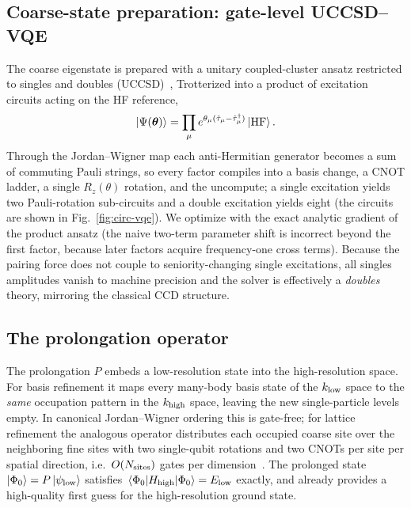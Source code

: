 \documentclass[
  aps,            %
  prc,            %
  reprint,        %
  superscriptaddress,
  floatfix,
  nofootinbib
]{revtex4-2}
\newcommand{\Hhigh}{H_{\mathrm{high}}}
\begin{document}
\subsection{Coarse-state preparation: gate-level UCCSD--VQE}
\label{sec:uccsd}
The coarse eigenstate is prepared with a unitary coupled-cluster ansatz restricted
to singles and doubles (UCCSD)~\cite{LeeUCC2019,Tilly2022}, Trotterized into a
product of excitation circuits acting on the HF reference,
\begin{equation}
  \ket{\Psi(\boldsymbol\theta)}
  =\prod_{\mu} e^{\theta_\mu(\hat\tau_\mu-\hat\tau_\mu^\dagger)}\ket{\rm HF}.
\end{equation}
Through the Jordan--Wigner map each anti-Hermitian generator becomes a sum of
commuting Pauli strings, so every factor compiles into a basis change, a CNOT ladder,
a single $R_z(\theta)$ rotation, and the uncompute; a single excitation yields two
Pauli-rotation sub-circuits and a double excitation yields eight (the circuits are
shown in Fig.~\ref{fig:circ-vqe}).  We optimize with
the exact analytic gradient of the product ansatz (the naive two-term parameter shift
is incorrect beyond the first factor, because later factors acquire frequency-one
cross terms).  Because the pairing force does not couple to seniority-changing
single excitations, all singles amplitudes vanish to machine precision and the
solver is effectively a \emph{doubles} theory, mirroring the classical CCD structure.

\subsection{The prolongation operator}
The prolongation $P$ embeds a low-resolution state into the high-resolution space.
For basis refinement it maps every many-body basis state of the $k_{\rm low}$ space to
the \emph{same} occupation pattern in the $k_{\rm high}$ space, leaving the new
single-particle levels empty.  In canonical Jordan--Wigner ordering this is
gate-free; for lattice refinement the analogous operator distributes each occupied
coarse site over the neighboring fine sites with two single-qubit rotations and two
CNOTs per site per spatial direction, i.e.\ $O(N_{\rm sites})$ gates per
dimension~\cite{Bogner2026}.  The prolonged state $\ket{\Phi_0}=P\ket{\psi_{\rm low}}$
satisfies $\expval{\Hhigh}{\Phi_0}=E_{\rm low}$ exactly, and already provides a
high-quality first guess for the high-resolution ground state.
\end{document}
